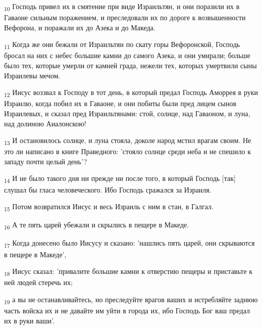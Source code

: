 \begin{tcolorbox}
\textsubscript{10} Господь привел их в смятение при виде Израильтян, и они поразили их в Гаваоне сильным поражением, и преследовали их по дороге к возвышенности Вефорона, и поражали их до Азека и до Македа.
\end{tcolorbox}
\begin{tcolorbox}
\textsubscript{11} Когда же они бежали от Израильтян по скату горы Вефоронской, Господь бросал на них с небес большие камни до самого Азека, и они умирали; больше было тех, которые умерли от камней града, нежели тех, которых умертвили сыны Израилевы мечом.
\end{tcolorbox}
\begin{tcolorbox}
\textsubscript{12} Иисус воззвал к Господу в тот день, в который предал Господь Аморрея в руки Израилю, когда побил их в Гаваоне, и они побиты были пред лицем сынов Израилевых, и сказал пред Израильтянами: стой, солнце, над Гаваоном, и луна, над долиною Аиалонскою!
\end{tcolorbox}
\begin{tcolorbox}
\textsubscript{13} И остановилось солнце, и луна стояла, доколе народ мстил врагам своим. Не это ли написано в книге Праведного: 'стояло солнце среди неба и не спешило к западу почти целый день'?
\end{tcolorbox}
\begin{tcolorbox}
\textsubscript{14} И не было такого дня ни прежде ни после того, в который Господь [так] слушал бы гласа человеческого. Ибо Господь сражался за Израиля.
\end{tcolorbox}
\begin{tcolorbox}
\textsubscript{15} Потом возвратился Иисус и весь Израиль с ним в стан, в Галгал.
\end{tcolorbox}
\begin{tcolorbox}
\textsubscript{16} А те пять царей убежали и скрылись в пещере в Македе.
\end{tcolorbox}
\begin{tcolorbox}
\textsubscript{17} Когда донесено было Иисусу и сказано: 'нашлись пять царей, они скрываются в пещере в Македе',
\end{tcolorbox}
\begin{tcolorbox}
\textsubscript{18} Иисус сказал: 'привалите большие камни к отверстию пещеры и приставьте к ней людей стеречь их;
\end{tcolorbox}
\begin{tcolorbox}
\textsubscript{19} а вы не останавливайтесь, но преследуйте врагов ваших и истребляйте заднюю часть войска их и не давайте им уйти в города их, ибо Господь Бог ваш предал их в руки ваши'.
\end{tcolorbox}
